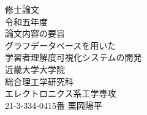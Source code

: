 \begin{titlepage}
\begin{center}
\vspace*{1cm}
\Large
{\Huge 修\hspace{2zw}士\hspace{2zw}論\hspace{2zw}文}\\
\vspace*{1cm}
{\huge 令和五年度}\\
\vspace*{2cm}
{\huge 論文内容の要旨}\\
\vspace*{1cm}
{\LARGE グラフデータベースを用いた\\
学習者理解度可視化システムの開発
}\\
\vspace*{7cm}
\LARGE{近畿大学大学院\\
総合理工学研究科\\
エレクトロニクス系工学専攻\\
21-3-334-0415番 \hspace{0.5zw} 栗\hspace{0.5zw}岡\hspace{0.5zw}陽\hspace{0.5zw}平
}
\end{center}
\end{titlepage}

\newpage

